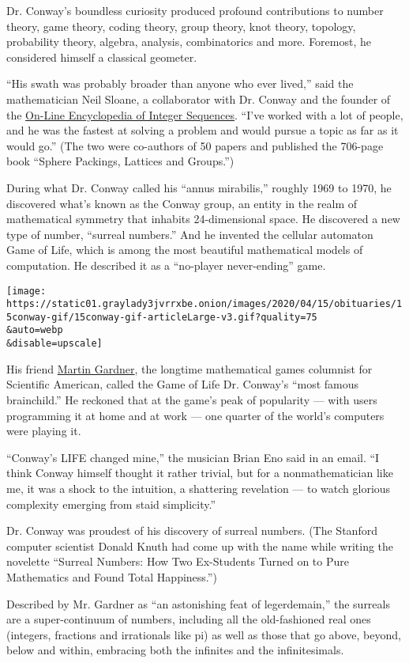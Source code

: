 Dr. Conway's boundless curiosity produced profound contributions to
number theory, game theory, coding theory, group theory, knot theory,
topology, probability theory, algebra, analysis, combinatorics and more.
Foremost, he considered himself a classical geometer.

``His swath was probably broader than anyone who ever lived,'' said the
mathematician Neil Sloane, a collaborator with Dr. Conway and the
founder of the \href{https://oeis.org/}{On-Line Encyclopedia of Integer
Sequences}. ``I've worked with a lot of people, and he was the fastest
at solving a problem and would pursue a topic as far as it would go.''
(The two were co-authors of 50 papers and published the 706-page book
``Sphere Packings, Lattices and Groups.'')

During what Dr. Conway called his ``annus mirabilis,'' roughly 1969 to
1970, he discovered what's known as the Conway group, an entity in the
realm of mathematical symmetry that inhabits 24-dimensional space. He
discovered a new type of number, ``surreal numbers.'' And he invented
the cellular automaton Game of Life, which is among the most beautiful
mathematical models of computation. He described it as a ``no-player
never-ending'' game.

\texttt{[image: https://static01.graylady3jvrrxbe.onion/images/2020/04/15/obituaries/15conway-gif/15conway-gif-articleLarge-v3.gif?quality=75\\\&auto=webp\\\&disable=upscale]}

His friend
\href{https://www.nytimes3xbfgragh.onion/2010/05/24/us/24gardner.html}{Martin
Gardner}, the longtime mathematical games columnist for Scientific
American, called the Game of Life Dr. Conway's ``most famous
brainchild.'' He reckoned that at the game's peak of popularity --- with
users programming it at home and at work --- one quarter of the world's
computers were playing it.

``Conway's LIFE changed mine,'' the musician Brian Eno said in an email.
``I think Conway himself thought it rather trivial, but for a
nonmathematician like me, it was a shock to the intuition, a shattering
revelation --- to watch glorious complexity emerging from staid
simplicity.''

Dr. Conway was proudest of his discovery of surreal numbers. (The
Stanford computer scientist Donald Knuth had come up with the name while
writing the novelette ``Surreal Numbers: How Two Ex-Students Turned on
to Pure Mathematics and Found Total Happiness.'')

Described by Mr. Gardner as ``an astonishing feat of legerdemain,'' the
surreals are a super-continuum of numbers, including all the
old-fashioned real ones (integers, fractions and irrationals like pi) as
well as those that go above, beyond, below and within, embracing both
the infinites and the infinitesimals.

